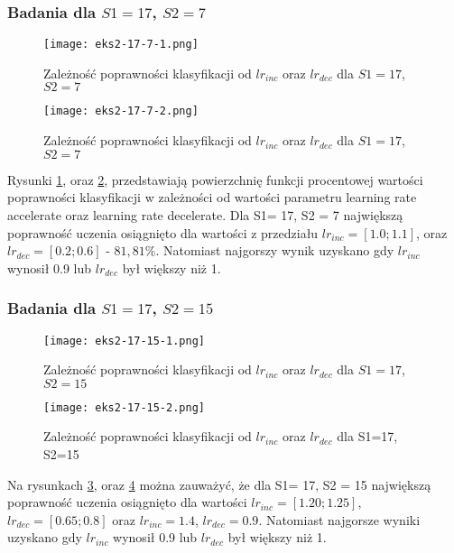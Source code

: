 \documentclass[12pt,twoside]{article}
\begin{document}
\newpage

\subsubsection{Badania dla $S1=17$, $S2=7$}

\begin{figure}[H]
\centering
\texttt{[image: eks2-17-7-1.png]}
\caption{Zależność poprawności klasyfikacji od $lr_{inc}$ oraz $lr_{dec}$ dla $S1=17$, $S2=7$}
\label{eks2-17-7-1}
\end{figure}

\begin{figure}[H]
\centering
\texttt{[image: eks2-17-7-2.png]}
\caption{Zależność poprawności klasyfikacji od $lr_{inc}$ oraz $lr_{dec}$ dla $S1=17$, $S2=7$}
\label{eks2-17-7-2}
\end{figure}

Rysunki \ref{eks2-17-7-1}, oraz \ref{eks2-17-7-2}, przedstawiają powierzchnię funkcji procentowej wartości poprawności klasyfikacji w zależności od
wartości parametru learning rate accelerate oraz learning rate decelerate. Dla S1= 17, S2 = 7 największą poprawność uczenia osiągnięto dla wartości z przedziału $lr_{inc}  = [1.0; 1.1]$, oraz $lr_{dec} = [0.2; 0.6]$ - $81,81\%$. Natomiast najgorszy wynik uzyskano gdy $lr_{inc}$ wynosił 0.9 lub $lr_{dec}$ był większy niż 1.

\subsubsection{Badania dla $S1=17$, $S2=15$}

\begin{figure}[H]
\centering
\texttt{[image: eks2-17-15-1.png]}
\caption{Zależność poprawności klasyfikacji od $lr_{inc}$ oraz $lr_{dec}$ dla $S1=17$, $S2=15$}
\label{eks2-17-15-1}
\end{figure}

\begin{figure}[H]
\centering
\texttt{[image: eks2-17-15-2.png]}
\caption{Zależność poprawności klasyfikacji od $lr_{inc}$ oraz $lr_{dec}$ dla S1=17, S2=15}
\label{eks2-17-15-2}
\end{figure}

Na rysunkach \ref{eks2-17-15-1}, oraz \ref{eks2-17-15-2} można zauważyć, że dla S1= 17, S2 = 15 największą poprawność uczenia osiągnięto dla wartości $lr_{inc}  = [1.20; 1.25]$, $lr_{dec} = [0.65; 0.8]$ oraz $lr_{inc}  = 1.4$, $lr_{dec} = 0.9$. Natomiast najgorsze wyniki uzyskano gdy $lr_{inc}$ wynosił 0.9 lub $lr_{dec}$ był większy niż 1.
\end{document}
